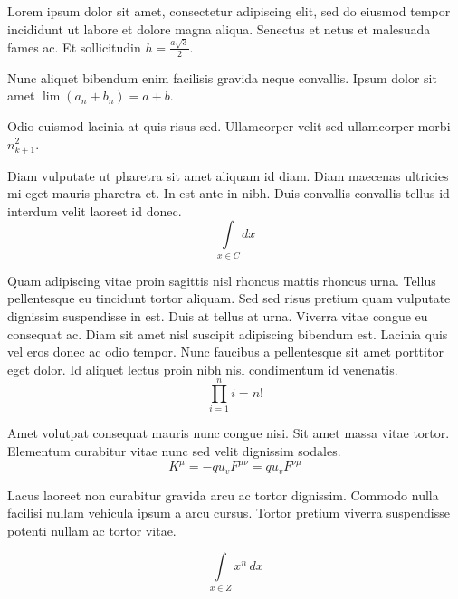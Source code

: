 \documentclass{article}
\begin{document}
Lorem ipsum dolor sit amet, consectetur adipiscing elit, sed do eiusmod tempor incididunt ut labore et dolore magna aliqua. Senectus et netus et malesuada fames ac. Et sollicitudin \begin{math}
	h=\frac{a\sqrt{3}}{2}
\end{math}.\newline
 
Nunc aliquet bibendum enim facilisis gravida neque convallis. Ipsum dolor sit amet $ \lim\left ( a_n+b_n \right )=a+b $.\newline
    
Odio euismod lacinia at quis risus sed. Ullamcorper velit sed ullamcorper morbi \( n_{k+1}^2 \).\newline

Diam vulputate ut pharetra sit amet aliquam id diam. Diam maecenas ultricies mi eget mauris pharetra et. In est ante in nibh. Duis convallis convallis tellus id interdum velit laoreet id donec. 
\[ \int\limits_{x\in C}dx \]

Quam adipiscing vitae proin sagittis nisl rhoncus mattis rhoncus urna. Tellus pellentesque eu tincidunt tortor aliquam. Sed sed risus pretium quam vulputate dignissim suspendisse in est. Duis at tellus at urna. Viverra vitae congue eu consequat ac. Diam sit amet nisl suscipit adipiscing bibendum est. Lacinia quis vel eros donec ac odio tempor. Nunc faucibus a pellentesque sit amet porttitor eget dolor. Id aliquet lectus proin nibh nisl condimentum id venenatis.
$$ \prod_{i=1}^ni=n! $$

Amet volutpat consequat mauris nunc congue nisi. Sit amet massa vitae tortor. Elementum curabitur vitae nunc sed velit dignissim sodales. 
\begin{displaymath}
	K^\mu =-qu_vF^{\mu \nu }=qu_vF^{\nu \mu }
\end{displaymath}

Lacus laoreet non curabitur gravida arcu ac tortor dignissim. Commodo nulla facilisi nullam vehicula ipsum a arcu cursus. Tortor pretium viverra suspendisse potenti nullam ac tortor vitae. 

\begin{equation}
	\int\limits_{x\in Z}\! x^{n}\, dx
\end{equation}
\end{document}
